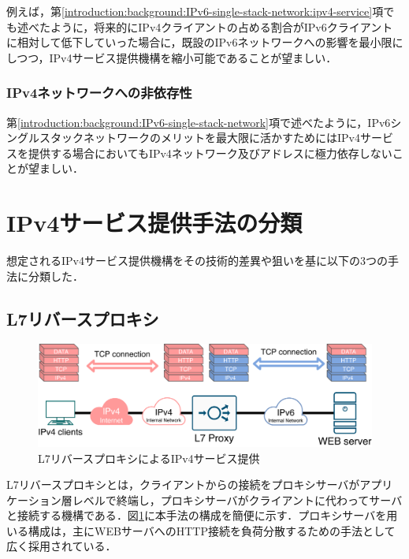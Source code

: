 例えば，第\ref{introduction:background:IPv6-single-stack-network:ipv4-service}項でも述べたように，将来的にIPv4クライアントの占める割合がIPv6クライアントに相対して低下していった場合に，既設のIPv6ネットワークへの影響を最小限にしつつ，IPv4サービス提供機構を縮小可能であることが望ましい．


\subsubsection{IPv4ネットワークへの非依存性}
第\ref{introduction:background:IPv6-single-stack-network}項で述べたように，IPv6シングルスタックネットワークのメリットを最大限に活かすためにはIPv4サービスを提供する場合においてもIPv4ネットワーク及びアドレスに極力依存しないことが望ましい．



\section{IPv4サービス提供手法の分類}
\label{related:compare}
想定されるIPv4サービス提供機構をその技術的差異や狙いを基に以下の3つの手法に分類した．

\subsection{L7リバースプロキシ}

\begin{figure}[h]
    \begin{center}
      \includegraphics[width=15cm,pagebox=cropbox,clip]{img/L7_proxy_model.pdf}
    \end{center}
    \caption{L7リバースプロキシによるIPv4サービス提供}
    \label{fig:L7_proxy_model}
\end{figure}


L7リバースプロキシとは，クライアントからの接続をプロキシサーバがアプリケーション層レベルで終端し，プロキシサーバがクライアントに代わってサーバと接続する機構である\cite{Gilly2011}．図\ref{fig:L7_proxy_model}に本手法の構成を簡便に示す．プロキシサーバを用いる構成は，主にWEBサーバへのHTTP接続を負荷分散するための手法として広く採用されている．

